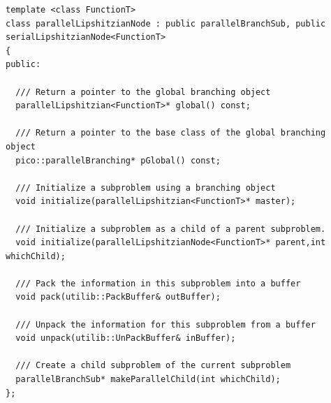 {\small
\begin{verbatim}
template <class FunctionT>
class parallelLipshitzianNode : public parallelBranchSub, public serialLipshitzianNode<FunctionT>
{
public:

  /// Return a pointer to the global branching object
  parallelLipshitzian<FunctionT>* global() const;

  /// Return a pointer to the base class of the global branching object
  pico::parallelBranching* pGlobal() const;

  /// Initialize a subproblem using a branching object
  void initialize(parallelLipshitzian<FunctionT>* master);

  /// Initialize a subproblem as a child of a parent subproblem.
  void initialize(parallelLipshitzianNode<FunctionT>* parent,int whichChild);

  /// Pack the information in this subproblem into a buffer
  void pack(utilib::PackBuffer& outBuffer);

  /// Unpack the information for this subproblem from a buffer
  void unpack(utilib::UnPackBuffer& inBuffer);

  /// Create a child subproblem of the current subproblem
  parallelBranchSub* makeParallelChild(int whichChild);
};
\end{verbatim}
}
